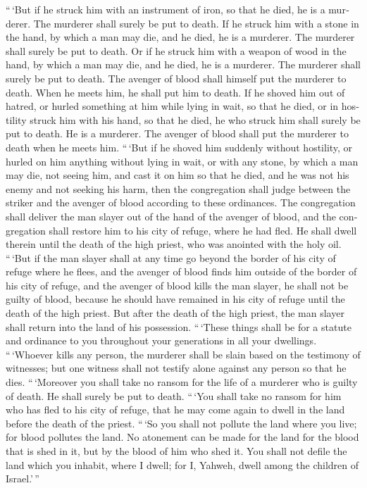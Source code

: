 \begin{paracol}{2}
\begin{otherlanguage}{english}
 ``\,`But if he struck him with an instrument of iron, so
that he died, he is a murderer. The murderer shall surely be put to
death.  If he struck him with a stone in the hand, by
which a man may die, and he died, he is a murderer. The murderer shall
surely be put to death.  Or if he struck him with a
weapon of wood in the hand, by which a man may die, and he died, he is a
murderer. The murderer shall surely be put to death.  The
avenger of blood shall himself put the murderer to death. When he meets
him, he shall put him to death.  If he shoved him out of
hatred, or hurled something at him while lying in wait, so that he died,
 or in hostility struck him with his hand, so that he
died, he who struck him shall surely be put to death. He is a murderer.
The avenger of blood shall put the murderer to death when he meets him.
 ``\,`But if he shoved him suddenly without hostility, or
hurled on him anything without lying in wait,  or with
any stone, by which a man may die, not seeing him, and cast it on him so
that he died, and he was not his enemy and not seeking his harm,
 then the congregation shall judge between the striker
and the avenger of blood according to these ordinances. 
The congregation shall deliver the man slayer out of the hand of the
avenger of blood, and the congregation shall restore him to his city of
refuge, where he had fled. He shall dwell therein until the death of the
high priest, who was anointed with the holy oil. 
``\,`But if the man slayer shall at any time go beyond the border of his
city of refuge where he flees,  and the avenger of blood
finds him outside of the border of his city of refuge, and the avenger
of blood kills the man slayer, he shall not be guilty of blood,
 because he should have remained in his city of refuge
until the death of the high priest. But after the death of the high
priest, the man slayer shall return into the land of his possession.
 ``\,`These things shall be for a statute and ordinance
to you throughout your generations in all your dwellings.
 ``\,`Whoever kills any person, the murderer shall be
slain based on the testimony of witnesses; but one witness shall not
testify alone against any person so that he dies. 
``\,`Moreover you shall take no ransom for the life of a murderer who is
guilty of death. He shall surely be put to death. 
``\,`You shall take no ransom for him who has fled to his city of
refuge, that he may come again to dwell in the land before the death of
the priest.  ``\,`So you shall not pollute the land where
you live; for blood pollutes the land. No atonement can be made for the
land for the blood that is shed in it, but by the blood of him who shed
it.  You shall not defile the land which you inhabit,
where I dwell; for I, Yahweh, dwell among the children of Israel.'\,''


\end{otherlanguage}
\end{paracol}
